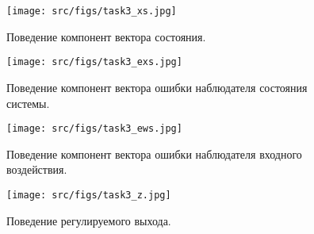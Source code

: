 \begin{figure}[ht!]
    \centering
    \texttt{[image: src/figs/task3\_xs.jpg]}
    \caption{Поведение компонент вектора состояния.}
    \label{fig:task3_xs}
  \end{figure} 

  \begin{figure}[ht!]
    \centering
    \texttt{[image: src/figs/task3\_exs.jpg]}
    \caption{Поведение компонент вектора ошибки наблюдателя состояния системы.}
    \label{fig:task3_exs}
  \end{figure} 
  \begin{figure}[ht!]
    \centering
    \texttt{[image: src/figs/task3\_ews.jpg]}
    \caption{Поведение компонент вектора ошибки наблюдателя входного воздействия.}
    \label{fig:task3_ews}
  \end{figure} 

  \begin{figure}[ht!]
    \centering
    \texttt{[image: src/figs/task3\_z.jpg]}
    \caption{Поведение регулируемого выхода.}
    \label{fig:task3_z}
  \end{figure} 